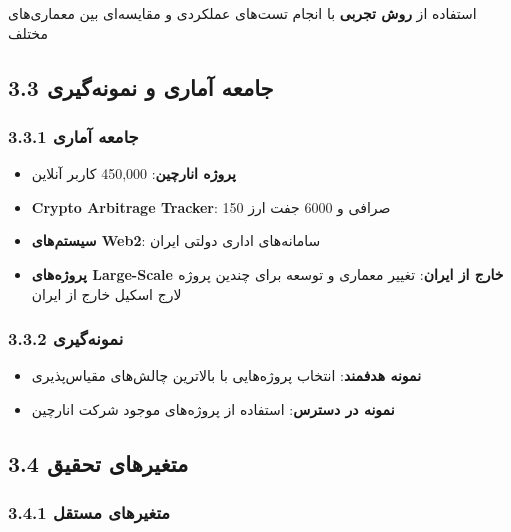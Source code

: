 \documentclass[
]{article}
\providecommand{\tightlist}{%
  \setlength{\itemsep}{0pt}\setlength{\parskip}{0pt}}
\begin{document}
استفاده از \textbf{روش تجربی} با انجام تست‌های عملکردی و مقایسه‌ای بین
معماری‌های مختلف

\subsection{3.3 جامعه آماری و
نمونه‌گیری}\label{ux62cux627ux645ux639ux647-ux622ux645ux627ux631ux6cc-ux648-ux646ux645ux648ux646ux647ux6afux6ccux631ux6cc}

\subsubsection{3.3.1 جامعه
آماری}\label{ux62cux627ux645ux639ux647-ux622ux645ux627ux631ux6cc}

\begin{itemize}
\tightlist
\item
  \textbf{پروژه انارچین}: 450,000 کاربر آنلاین
\item
  \textbf{Crypto Arbitrage Tracker}: 150 صرافی و 6000 جفت ارز
\item
  \textbf{سیستم‌های Web2}: سامانه‌های اداری دولتی ایران
\item
  \textbf{پروژه‌های Large-Scale خارج از ایران}: تغییر معماری و توسعه برای
  چندین پروژه لارج اسکیل خارج از ایران
\end{itemize}

\subsubsection{3.3.2
نمونه‌گیری}\label{ux646ux645ux648ux646ux647ux6afux6ccux631ux6cc}

\begin{itemize}
\tightlist
\item
  \textbf{نمونه هدفمند}: انتخاب پروژه‌هایی با بالاترین چالش‌های مقیاس‌پذیری
\item
  \textbf{نمونه در دسترس}: استفاده از پروژه‌های موجود شرکت انارچین
\end{itemize}

\subsection{3.4 متغیرهای
تحقیق}\label{ux645ux62aux63aux6ccux631ux647ux627ux6cc-ux62aux62dux642ux6ccux642}

\subsubsection{3.4.1 متغیرهای
مستقل}\label{ux645ux62aux63aux6ccux631ux647ux627ux6cc-ux645ux633ux62aux642ux644}
\end{document}
